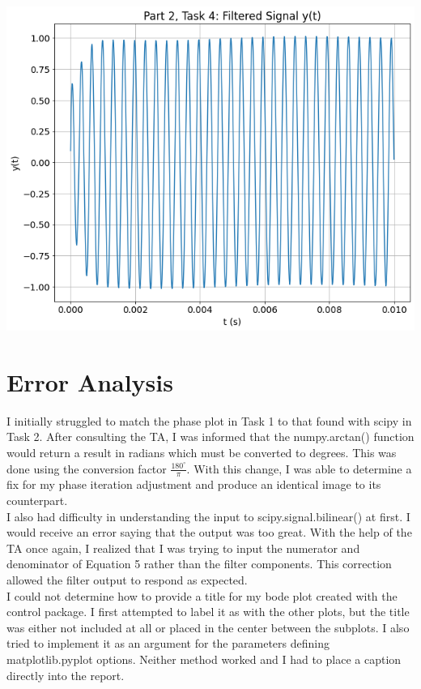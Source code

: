 \documentclass[12pt]{report}
\begin{document}
\begin{center}
	\includegraphics[scale = 0.4]{Lab 10 - Plots/Part2-Task4.png}\\[1.0 cm]
\end{center}

\section{Error Analysis}

I initially struggled to match the phase plot in Task 1 to that found with scipy in Task 2. After consulting the TA, I was informed that the numpy.arctan() function would return a result in radians which must be converted to degrees. This was done using the conversion factor $ \frac{180^\circ}{\pi} $. With this change, I was able to determine a fix for my phase iteration adjustment and produce an identical image to its counterpart. \\

I also had difficulty in understanding the input to scipy.signal.bilinear() at first. I would receive an error saying that the output was too great. With the help of the TA once again, I realized that I was trying to input the numerator and denominator of Equation 5 rather than the filter components. This correction allowed the filter output to respond as expected. \\

I could not determine how to provide a title for my bode plot created with the control package. I first attempted to label it as with the other plots, but the title was either not included at all or placed in the center between the subplots. I also tried to implement it as an argument for the parameters defining matplotlib.pyplot options. Neither method worked and I had to place a caption directly into the report. \\ 
\end{document}
